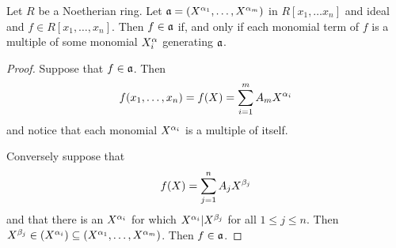 \begin{lemma}\label{lemma_7.6.3}
  Let $R$ be a Noetherian ring. Let $\mathfrak{a}=(X^{\alpha_1}, \dots, X^{\alpha_m})$ in $R[x_1,
  \dots x_n]$ and ideal and $f \in R[x_1, \dots, x_n]$. Then $f \in
  \mathfrak{a}$ if, and only if each monomial term of $f$ is a multiple of some
  monomial  $X^\alpha_i$ generating $\mathfrak{a}$.
\end{lemma}
\begin{proof}
  Suppose that $f \in \mathfrak{a}$. Then
  \begin{equation*}
    f(x_1, \dots, x_n)=f(X)=\sum_{i=1}^m{A_mX^{\alpha_i}}
  \end{equation*}
  and notice that each monomial $X^{\alpha_i}$ is a multiple of itself.

  Conversely suppose that
  \begin{equation*}
    f(X)=\sum_{j=1}^n{A_jX^{\beta_j}}
  \end{equation*}
  and that there is an $X^{\alpha_i}$ for which $X^{\alpha_i}|X^{\beta_j}$ for
  all $1 \leq j \leq n$. Then $X^{\beta_j} \in (X^{\alpha_i}) \subseteq
  (X^{\alpha_1}, \dots, X^{\alpha_m})$. Then $f \in \mathfrak{a}$.
\end{proof}

